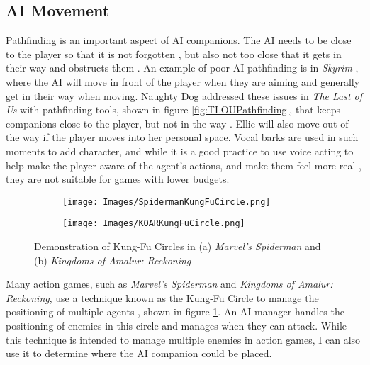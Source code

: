 \documentclass{IEEEtran}
\begin{document}
\subsection{AI Movement}
\label{Movement}

Pathfinding is an important aspect of AI companions. The AI needs to be close to the player so that it is not forgotten \cite{GAIP2EllieAI}, but also not too close that it gets in their way and obstructs them \cite{CoupledEmpowermentMaximisation}. An example of poor AI pathfinding is in \textit{Skyrim} \cite{tremblay2013adaptive}, where the AI will move in front of the player when they are aiming and generally get in their way when moving. Naughty Dog addressed these issues in \textit{The Last of Us} with pathfinding tools, shown in figure \ref{fig:TLOUPathfinding}, that keeps companions close to the player, but not in the way \cite{GAIP2EllieAI}. Ellie will also move out of the way if the player moves into her personal space. Vocal barks are used in such moments to add character, and while it is a good practice to use voice acting to help make the player aware of the agent’s actions, and make them feel more real \cite{GMTGoodAI}, they are not suitable for games with lower budgets.

\begin{figure}
  \centering
  
  \begin{subfigure}[a]{\linewidth}
  \texttt{[image: Images/SpidermanKungFuCircle.png]}
  \end{subfigure}
  
  \begin{subfigure}[b]{\linewidth}
  \texttt{[image: Images/KOARKungFuCircle.png]}
  \end{subfigure}
  
  \caption{Demonstration of Kung-Fu Circles in (a) \textit{Marvel's Spiderman} and (b) \textit{Kingdoms of Amalur: Reckoning}}
  \label{fig:KungFuCircle}
\end{figure}

Many action games, such as \textit{Marvel's Spiderman} and \textit{Kingdoms of Amalur: Reckoning}, use a technique known as the Kung-Fu Circle to manage the positioning of multiple agents \cite{GAIPKungFuCircle, GDCSpiderman}, shown in figure \ref{fig:KungFuCircle}. An AI manager handles the positioning of enemies in this circle and manages when they can attack. While this technique is intended to manage multiple enemies in action games, I can also use it to determine where the AI companion could be placed.
\end{document}
